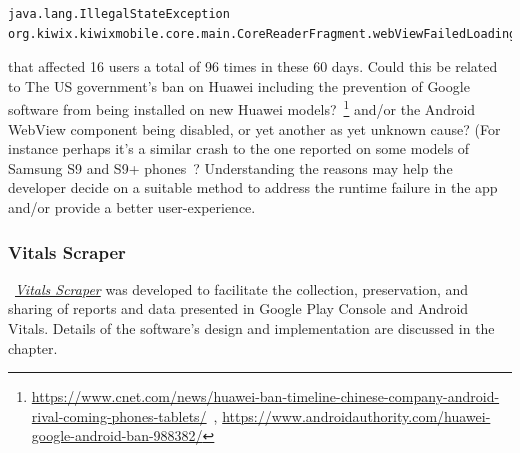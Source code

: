\begin{lstlisting}
java.lang.IllegalStateException
org.kiwix.kiwixmobile.core.main.CoreReaderFragment.webViewFailedLoading
\end{lstlisting}

that affected 16 users a total of 96 times in these 60 days. %
Could this be related to The US government's ban on Huawei including the prevention of Google software from being installed on new Huawei models?~\footnote{\url{https://www.cnet.com/news/huawei-ban-timeline-chinese-company-android-rival-coming-phones-tablets/}~\citep{androidauthority2021_the_huawei_ban}, \url{https://www.androidauthority.com/huawei-google-android-ban-988382/}} and/or the Android WebView component being disabled, or yet another as yet unknown cause? (For instance perhaps it's a similar crash to the one reported on some models of Samsung S9 and S9+ phones~\citep{ebling2018_so_s9_specific_webview_device_crash_report}? Understanding the reasons may help the developer decide on a suitable method to address the runtime failure in the app and/or provide a better user-experience.




\subsubsection{Vitals Scraper}
~\href{section-vitals-scraper}{\emph{Vitals Scraper}} was developed to facilitate the collection, preservation, and sharing of reports and data presented in Google Play Console and Android Vitals. Details of the software's design and implementation are discussed in the~\href{chapter-code-needed}{} chapter.

